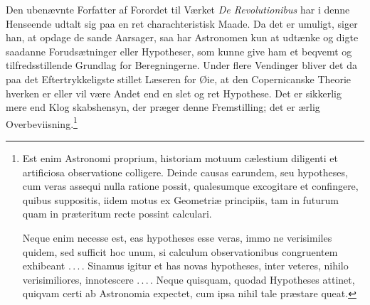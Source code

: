 \documentclass[12pt,a4paper]{book}
\begin{document}
Den ubenævnte Forfatter af Forordet til Værket \textit{De
Revolutionibus} har i denne Henseende udtalt sig paa en ret
charachteristisk Maade. Da det er umuligt, siger han, at opdage de
sande Aarsager, saa har Astronomen kun at udtænke og digte saadanne
Forudsætninger eller Hypotheser, som kunne give ham et beqvemt og
tilfredsstillende Grundlag for Beregningerne. Under flere Vendinger
bliver det da paa det Eftertrykkeligste stillet Læseren for Øie, at den
Copernicanske Theorie hverken er eller vil være Andet end en slet og
ret Hypothese. Det er sikkerlig mere end Klog\-%
skabshensyn, der præger denne Fremstilling; det er ærlig
Overbeviisning.\footnote{%
Est enim Astronomi proprium, historiam motuum cælestium diligenti et
artificiosa observatione colligere. Deinde causas earundem, seu
hypotheses, cum veras assequi nulla ratione possit, qualesumque
excogitare et confingere, quibus suppositis, iidem motus ex Geometriæ
principiis, tam in futurum quam in præteritum recte possint calculari.\par
Neque enim necesse est, eas hypotheses esse veras, immo ne verisimiles
quidem, sed sufficit hoc unum, si calculum observationibus congruentem
exhibeant .\,.\,.\,. Sinamus igitur et has novas hypotheses, inter
veteres, nihilo verisimiliores, innotescere .\,.\,.\,. Neque quisquam,
quodad Hypotheses attinet, quiqvam certi ab Astronomia expectet, cum
ipsa nihil tale præstare queat.}
\end{document}
